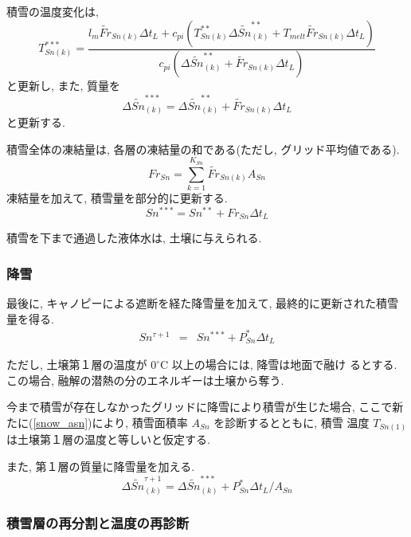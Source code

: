 積雪の温度変化は, 
\begin{equation}
 T_{Sn(k)}^{***} = \frac{l_m \widetilde{Fr}_{Sn(k)}\Delta t_L 
   +c_{pi}(T_{Sn(k)}^{**}\Delta \widetilde{Sn}_{(k)}^{**} + T_{melt} \widetilde{Fr}_{Sn(k)}\Delta t_L ) }
  {c_{pi} (\Delta \widetilde{Sn}_{(k)}^{**} + \widetilde{Fr}_{Sn(k)}\Delta t_L)}
\end{equation}
と更新し, また, 質量を
\begin{equation}
 \Delta \widetilde{Sn}_{(k)}^{***} = \Delta \widetilde{Sn}_{(k)}^{**} + \widetilde{Fr}_{Sn(k)}\Delta t_L
\end{equation}
と更新する. 

積雪全体の凍結量は, 各層の凍結量の和である(ただし, グリッド平均値である). 
\begin{equation}
 Fr_{Sn} = \sum_{k=1}^{K_{Sn}} \widetilde{Fr}_{Sn(k)} A_{Sn}
\end{equation}
凍結量を加えて, 積雪量を部分的に更新する. 
\begin{equation}
 Sn^{***} = Sn^{**} + Fr_{Sn} \Delta t_L
\end{equation}

積雪を下まで通過した液体水は, 土壌に与えられる. 

\subsubsection{降雪}

最後に, キャノピーによる遮断を経た降雪量を加えて, 最終的に更新された積雪
量を得る. 
\begin{eqnarray}
 Sn^{\tau+1} &=& Sn^{***} + P_{Sn}^* \Delta t_L
\end{eqnarray}

ただし, 土壌第１層の温度が $0^{\circ}$C 以上の場合には, 降雪は地面で融け
るとする. この場合, 融解の潜熱の分のエネルギーは土壌から奪う. 

今まで積雪が存在しなかったグリッドに降雪により積雪が生じた場合, ここで新
たに(\ref{snow_asn})により, 積雪面積率 $A_{Sn}$ を診断するとともに, 積雪
温度 $T_{Sn(1)}$ は土壌第１層の温度と等しいと仮定する. 

また, 第１層の質量に降雪量を加える. 
\begin{equation}
 \Delta \widetilde{Sn}_{(k)}^{\tau+1} = \Delta \widetilde{Sn}_{(k)}^{***} + P_{Sn}^* \Delta t_L /A_{Sn}
\end{equation}

\subsubsection{積雪層の再分割と温度の再診断}

